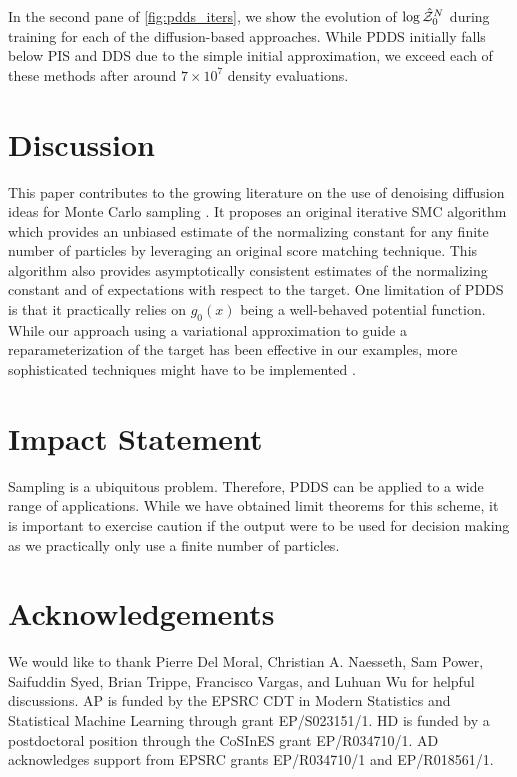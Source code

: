 \documentclass{article}
\theoremstyle{plain}
\theoremstyle{definition}
\theoremstyle{remark}
\begin{document}
In the second pane of \cref{fig:pdds_iters}, we show the evolution of $\log \hat {\mathcal Z}^N_0$ during training for each of the diffusion-based approaches. While PDDS initially falls below PIS and DDS due to the simple initial approximation, we exceed each of these methods after around $7\times10^7$ density evaluations. %









\section{Discussion}
This paper contributes to the growing literature on the use of denoising diffusion ideas for Monte Carlo sampling \citep{berner2022optimal,mcdonald2022proposal,vargasDDSampler2023,huang2023monte,richter2023improved}. It proposes an original iterative SMC algorithm which provides an unbiased estimate of the normalizing constant for any finite number of particles by leveraging an original score matching technique. This algorithm also provides asymptotically consistent estimates of the normalizing constant and of expectations with respect to the target. One limitation of PDDS is that it practically relies on $g_0(x)$ being a well-behaved potential function. While our approach using a variational approximation to guide a reparameterization of the target has been effective in our examples, more sophisticated techniques might have to be implemented \citep{hoffman2019neutra}.


\clearpage

\section*{Impact Statement}
Sampling is a ubiquitous problem. Therefore, PDDS can be applied to a wide range of applications. While we have obtained limit theorems for this scheme, it is important to exercise caution if the output were to be used for decision making as we practically only use a finite number of particles.

\section*{Acknowledgements}
We would like to thank Pierre Del Moral, Christian A. Naesseth, Sam Power, Saifuddin Syed, Brian Trippe, Francisco Vargas, and Luhuan Wu for helpful discussions. AP is funded by the EPSRC CDT in Modern Statistics and Statistical Machine Learning through grant EP/S023151/1. HD is funded by a postdoctoral position through the CoSInES grant EP/R034710/1. AD acknowledges support from EPSRC grants EP/R034710/1 and EP/R018561/1.
\newpage


\end{document}
